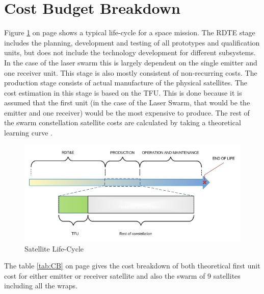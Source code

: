 \section{Cost Budget Breakdown}
\label{DDCB}
Figure \ref{fig:lifecycle} on page \pageref{fig:lifecycle} shows a typical life-cycle for a space mission. The \ac{RDTE} stage includes the planning, development and testing of all prototypes and qualification units, but does not include the technology development for different subsystems. In the case of the laser swarm this is largely dependent on the single emitter and one receiver unit. This stage is also mostly consistent of non-recurring costs. The production stage consists of actual manufacture of the physical satellites. The cost estimation in this stage is based on the \ac{TFU}. This is done because it is assumed that the first unit (in the case of the Laser Swarm, that would be the emitter and one receiver) would be the most expensive to produce. The rest of the swarm constellation satellite costs are calculated by taking a theoretical learning curve \cite{larson}. 

\begin{figure}[ht!]
\centering
\includegraphics[scale = 0.8]{chapters/img/lifetime.jpg}
\caption{Satellite Life-Cycle}
\label{fig:lifecycle}
\end{figure}

The table \ref{tab:CB} on page \pageref{tab:CB} gives the cost breakdown of both theoretical first unit cost for either emitter or receiver satellite and also the swarm of 9 satellites including all the wraps.


